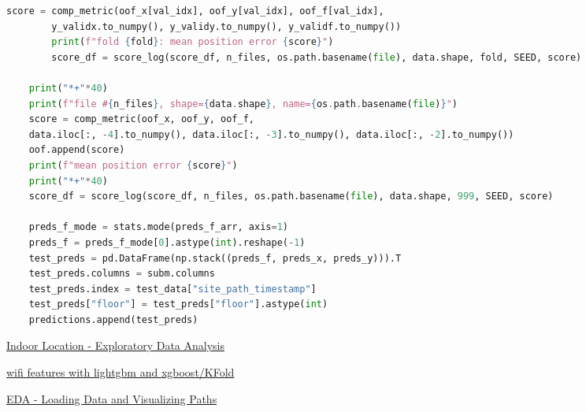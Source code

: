 \documentclass{article}
\begin{document}
\begin{latin}
\begin{lstlisting}[language=Python]
		score = comp_metric(oof_x[val_idx], oof_y[val_idx], oof_f[val_idx],
		y_validx.to_numpy(), y_validy.to_numpy(), y_validf.to_numpy())
		print(f"fold {fold}: mean position error {score}")
		score_df = score_log(score_df, n_files, os.path.basename(file), data.shape, fold, SEED, score)

	print("*+"*40)
	print(f"file #{n_files}, shape={data.shape}, name={os.path.basename(file)}")
	score = comp_metric(oof_x, oof_y, oof_f,
	data.iloc[:, -4].to_numpy(), data.iloc[:, -3].to_numpy(), data.iloc[:, -2].to_numpy())
	oof.append(score)
	print(f"mean position error {score}")
	print("*+"*40)
	score_df = score_log(score_df, n_files, os.path.basename(file), data.shape, 999, SEED, score)

	preds_f_mode = stats.mode(preds_f_arr, axis=1)
	preds_f = preds_f_mode[0].astype(int).reshape(-1)
	test_preds = pd.DataFrame(np.stack((preds_f, preds_x, preds_y))).T
	test_preds.columns = subm.columns
	test_preds.index = test_data["site_path_timestamp"]
	test_preds["floor"] = test_preds["floor"].astype(int)
	predictions.append(test_preds)
\end{lstlisting}
\end{latin}
\begin{flushleft}
	\begin{latin}
		\begin{thebibliography}{9}
			\href{https://www.kaggle.com/ihelon/indoor-location-exploratory-data-analysis}{Indoor Location - Exploratory Data Analysis}
			
			\href{https://www.kaggle.com/hiro5299834/wifi-features-with-lightgbm-and-xgboost-kfold}{wifi features with lightgbm and xgboost/KFold}
			
			\href{https://www.kaggle.com/titericz/eda-loading-data-and-visualizing-paths}{EDA - Loading Data and Visualizing Paths}
		\end{thebibliography}
	\end{latin}
\end{flushleft}
\end{document}
